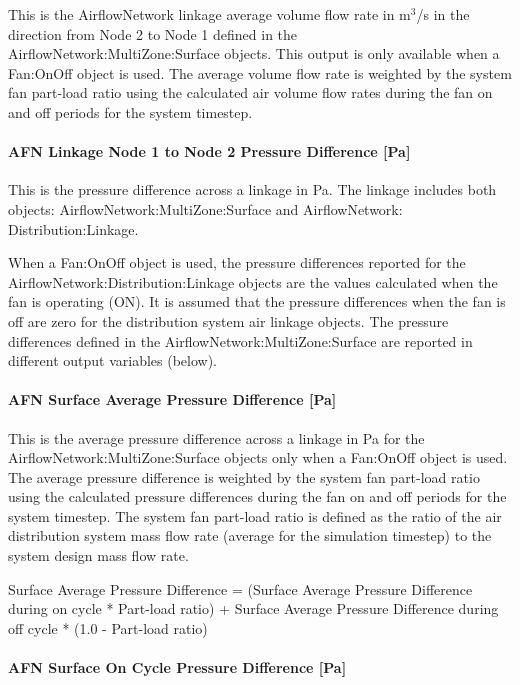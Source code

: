 This is the AirflowNetwork linkage average volume flow rate in m\(^{3}\)/s in the direction from Node 2 to Node 1 defined in the AirflowNetwork:MultiZone:Surface objects. This output is only available when a Fan:OnOff object is used. The average volume flow rate is weighted by the system fan part-load ratio using the calculated air volume flow rates during the fan on and off periods for the system timestep.

\paragraph{AFN Linkage Node 1 to Node 2 Pressure Difference {[}Pa{]}}\label{afn-linkage-node-1-to-node-2-pressure-difference-pa}

This is the pressure difference across a linkage in Pa. The linkage includes both objects: AirflowNetwork:MultiZone:Surface and AirflowNetwork: Distribution:Linkage.

When a Fan:OnOff object is used, the pressure differences reported for the AirflowNetwork:Distribution:Linkage objects are the values calculated when the fan is operating (ON). It is assumed that the pressure differences when the fan is off are zero for the distribution system air linkage objects. The pressure differences defined in the AirflowNetwork:MultiZone:Surface are reported in different output variables (below).

\paragraph{AFN Surface Average Pressure Difference {[}Pa{]}}\label{afn-surface-average-pressure-difference-pa}

This is the average pressure difference across a linkage in Pa for the AirflowNetwork:MultiZone:Surface objects only when a Fan:OnOff object is used. The average pressure difference is weighted by the system fan part-load ratio using the calculated pressure differences during the fan on and off periods for the system timestep. The system fan part-load ratio is defined as the ratio of the air distribution system mass flow rate (average for the simulation timestep) to the system design mass flow rate.

Surface Average Pressure Difference = (Surface Average Pressure Difference during on cycle * Part-load ratio) + Surface Average Pressure Difference during off cycle * (1.0 - Part-load ratio)

\paragraph{AFN Surface On Cycle Pressure Difference {[}Pa{]}}\label{afn-surface-on-cycle-pressure-difference-pa}

